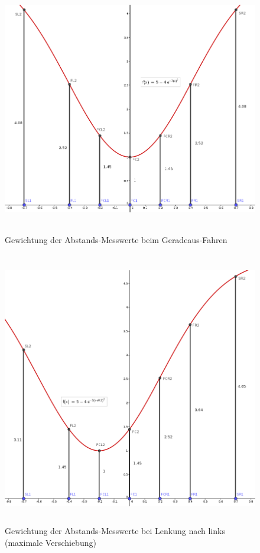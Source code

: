 \documentclass[12pt, a4paper]{scrartcl}
\begin{document}
\begin{figure}[!ht]
	\centering
	\includegraphics[width=\textwidth, height=11cm, keepaspectratio]{Bilder/Gauss_Sensorgewichtung_gerade.png}
	\caption{Gewichtung der Abstands-Messwerte beim Geradeaus-Fahren}
	\label{img:gaussian-weighted-dist-straight}
\end{figure}

\begin{figure}[!ht]
	\centering
	\includegraphics[width=\textwidth, height=12cm, keepaspectratio]{Bilder/Gauss_Sensorgewichtung_geneigt.png}
	\caption{Gewichtung der Abstands-Messwerte bei Lenkung nach links (maximale Verschiebung)}
	\label{img:gaussian-weighted-dist-curve}
\end{figure}
\end{document}
